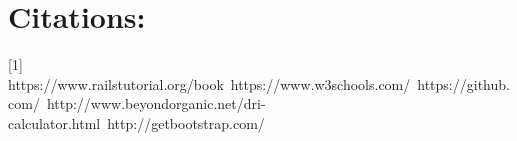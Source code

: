 \documentclass[a4paper]{article}
\begin{document}
\section{Citations: }
[1] https://www.railstutorial.org/book~\cite{web1}\newline
[2]	https://www.w3schools.com/~\cite{web2}\newline 
[3] https://github.com/~\cite{web3}\newline
[4] http://www.beyondorganic.net/dri-calculator.html~\cite{web4}\newline
[5] http://getbootstrap.com/~\cite{web5}\newline
\end{document}
